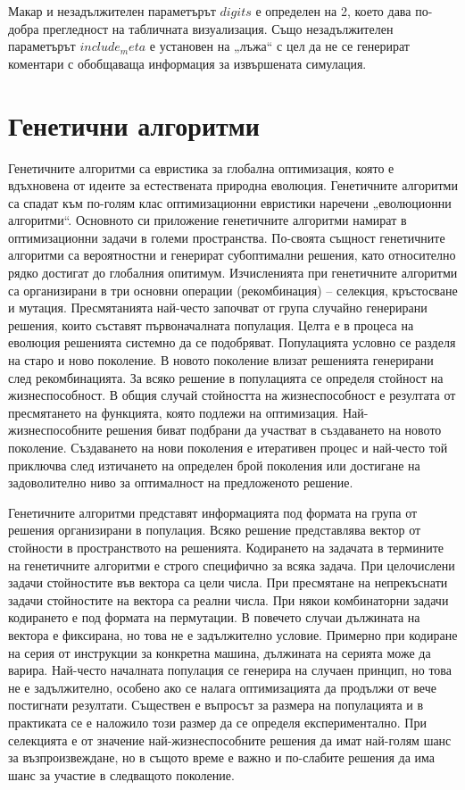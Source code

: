 Макар и незадължителен параметърът $digits$ е определен на 2, което дава по-добра прегледност на табличната визуализация. Също незадължителен параметърът $include_meta$ е установен на „лъжа“ с цел да не се генерират коментари с обобщаваща информация за извършената симулация. 

\section{Генетични алгоритми}

Генетичните алгоритми са евристика за глобална оптимизация, която е вдъхновена от идеите за естествената природна еволюция. Генетичните алгоритми са спадат към по-голям клас оптимизационни евристики наречени „еволюционни алгоритми“. Основното си приложение генетичните алгоритми намират в оптимизационни задачи в големи пространства. По-своята същност генетичните алгоритми са вероятностни и генерират субоптимални решения, като относително рядко достигат до глобалния опитимум. Изчисленията при генетичните алгоритми са организирани в три основни операции (рекомбинация) – селекция, кръстосване и мутация. Пресмятанията най-често започват от група случайно генерирани решения, които съставят първоначалната популация. Целта е в процеса на еволюция решенията системно да се подобряват. Популацията условно се разделя на старо и ново поколение. В новото поколение влизат решенията генерирани след рекомбинацията. За всяко решение в популацията се определя стойност на жизнеспособност. В общия случай стойността на жизнеспособност е резултата от пресмятането на функцията, която подлежи на оптимизация. Най-жизнеспособните решения биват подбрани да участват в създаването на новото поколение. Създаването на нови поколения е итеративен процес и най-често той приключва след изтичането на определен брой поколения или достигане на задоволително ниво за оптималност на предложеното решение. 

Генетичните алгоритми представят информацията под формата на група от решения организирани в популация. Всяко решение представлява вектор от стойности в пространството на решенията. Кодирането на задачата в термините на генетичните алгоритми е строго специфично за всяка задача. При целочислени задачи стойностите във вектора са цели числа. При пресмятане на непрекъснати задачи стойностите на вектора са реални числа. При някои комбинаторни задачи кодирането е под формата на пермутации. В повечето случаи дължината на вектора е фиксирана, но това не е задължително условие. Примерно при кодиране на серия от инструкции за конкретна машина, дължината на серията може да варира. Най-често началната популация се генерира на случаен принцип, но това не е задължително, особено ако се налага оптимизацията да продължи от вече постигнати резултати. Съществен е въпросът за размера на популацията и в практиката се е наложило този размер да се определя експериментално. При селекцията е от значение най-жизнеспособните решения да имат най-голям шанс за възпроизвеждане, но в същото време е важно и по-слабите решения да има шанс за участие в следващото поколение. 

